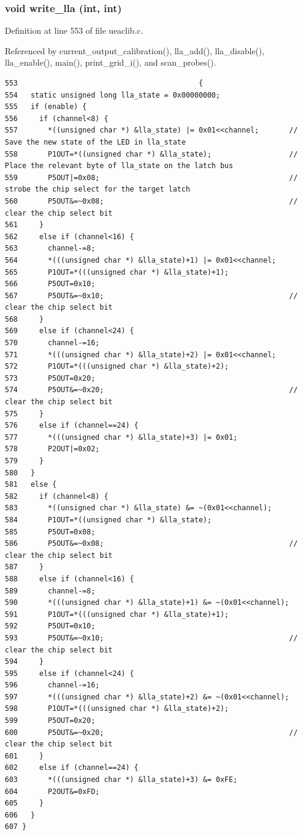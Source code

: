 \subsubsection{\setlength{\rightskip}{0pt plus 5cm}void write\_\-lla (int, int)}\label{ueaclib_8h_a15}




Definition at line 553 of file ueaclib.c.

Referenced by current\_\-output\_\-calibration(), lla\_\-add(), lla\_\-disable(), lla\_\-enable(), main(), print\_\-grid\_\-i(), and scan\_\-probes().

\footnotesize\begin{verbatim}553                                          {
554   static unsigned long lla_state = 0x00000000;
555   if (enable) {
556     if (channel<8) {
557       *((unsigned char *) &lla_state) |= 0x01<<channel;       // Save the new state of the LED in lla_state
558       P1OUT=*((unsigned char *) &lla_state);                  // Place the relevant byte of lla_state on the latch bus 
559       P5OUT|=0x08;                                            // strobe the chip select for the target latch
560       P5OUT&=~0x08;                                           // clear the chip select bit
561     }
562     else if (channel<16) {
563       channel-=8;
564       *(((unsigned char *) &lla_state)+1) |= 0x01<<channel;  
565       P1OUT=*(((unsigned char *) &lla_state)+1);  
566       P5OUT=0x10;
567       P5OUT&=~0x10;                                           // clear the chip select bit
568     }
569     else if (channel<24) {
570       channel-=16;
571       *(((unsigned char *) &lla_state)+2) |= 0x01<<channel;  
572       P1OUT=*(((unsigned char *) &lla_state)+2);  
573       P5OUT=0x20;
574       P5OUT&=~0x20;                                           // clear the chip select bit
575     }
576     else if (channel==24) {
577       *(((unsigned char *) &lla_state)+3) |= 0x01;  
578       P2OUT|=0x02;
579     }
580   }
581   else {
582     if (channel<8) {
583       *((unsigned char *) &lla_state) &= ~(0x01<<channel);  
584       P1OUT=*((unsigned char *) &lla_state);  
585       P5OUT=0x08;
586       P5OUT&=~0x08;                                           // clear the chip select bit
587     }
588     else if (channel<16) {
589       channel-=8;
590       *(((unsigned char *) &lla_state)+1) &= ~(0x01<<channel);  
591       P1OUT=*(((unsigned char *) &lla_state)+1);  
592       P5OUT=0x10;
593       P5OUT&=~0x10;                                           // clear the chip select bit
594     }
595     else if (channel<24) {
596       channel-=16;
597       *(((unsigned char *) &lla_state)+2) &= ~(0x01<<channel);  
598       P1OUT=*(((unsigned char *) &lla_state)+2);  
599       P5OUT=0x20;
600       P5OUT&=~0x20;                                           // clear the chip select bit
601     }
602     else if (channel==24) {
603       *(((unsigned char *) &lla_state)+3) &= 0xFE;  
604       P2OUT&=0xFD;
605     }
606   }
607 }
\end{verbatim}\normalsize 


